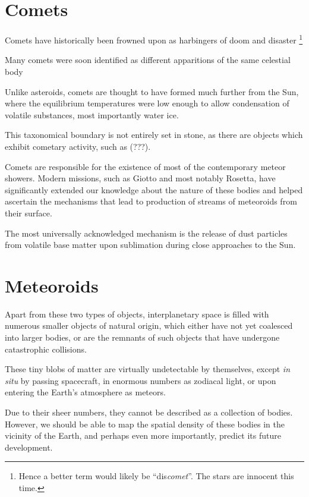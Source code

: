 \section{Comets} \label{ac}
    Comets have historically been frowned upon as harbingers of doom and disaster%
    \footnote{Hence a better term would likely be ``dis\textit{comet}''. The stars are innocent this time.}

    Many comets were soon identified as different apparitions of the same celestial body 

    Unlike asteroids, comets are thought to have formed much further from the Sun, where the equilibrium
    temperatures were low enough to allow condensation of volatile substances, most importantly water ice.

    This taxonomical boundary is not entirely set in stone, as there are objects which exhibit
    cometary activity, such as (???). 

    Comets are responsible for the existence of most of the contemporary meteor showers.
    Modern missions, such as Giotto and most notably Rosetta, have significantly extended our knowledge
    about the nature of these bodies and helped ascertain the mechanisms that lead to production
    of streams of meteoroids from their surface.

    The most universally acknowledged mechanism is the release of dust particles from
    volatile base matter upon sublimation during close approaches to the Sun.

\section{Meteoroids} \label{am}
    Apart from these two types of objects, interplanetary space is filled with numerous smaller objects
    of natural origin, which either have not yet coalesced into larger bodies, or are the remnants
    of such objects that have undergone catastrophic collisions.

    These tiny blobs of matter are virtually undetectable by themselves, except \textit{in situ} by passing spacecraft,
    in enormous numbers as zodiacal light, or upon entering the Earth's atmosphere as meteors.

    Due to their sheer numbers, they cannot be described as a collection of bodies.
    However, we should be able to map the spatial density of these bodies in the vicinity of the Earth,
    and perhaps even more importantly, predict its future development.

